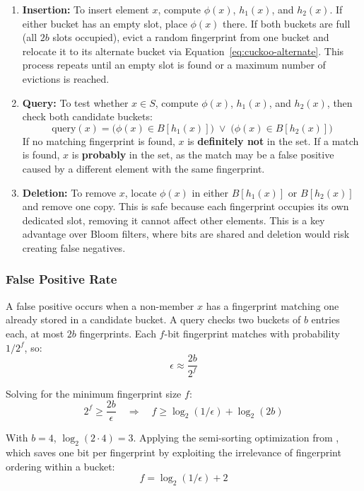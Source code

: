 \begin{enumerate}
  \item \textbf{Insertion:} To insert element $x$, compute $\phi(x)$, $h_1(x)$, 
and $h_2(x)$. If either bucket has an empty slot, place $\phi(x)$ there. 
If both buckets are full (all $2b$ slots occupied), evict a random 
fingerprint from one bucket and relocate it to its alternate bucket via 
Equation~\ref{eq:cuckoo-alternate}. This process repeats until an empty 
slot is found or a maximum number of evictions is reached.
\item \textbf{Query:} To test whether $x \in S$, compute $\phi(x)$, $h_1(x)$, 
and $h_2(x)$, then check both candidate buckets:
\[
  \text{query}(x) = \big(\phi(x) \in B[h_1(x)]\big) \;\lor\; 
                     \big(\phi(x) \in B[h_2(x)]\big)
\]
If no matching fingerprint is found, $x$ is \textbf{definitely not} in 
the set. If a match is found, $x$ is \textbf{probably} in the set, as the match may be a false positive caused by a different element with the 
same fingerprint.
\item \textbf{Deletion:} To remove $x$, locate $\phi(x)$ in either 
$B[h_1(x)]$ or $B[h_2(x)]$ and remove one copy. This is safe because 
each fingerprint occupies its own dedicated slot, removing it cannot 
affect other elements. This is a key advantage over Bloom filters, where 
bits are shared and deletion would risk creating false negatives.
\end{enumerate}

\subsubsection{False Positive Rate}

A false positive occurs when a non-member $x$ has a fingerprint matching 
one already stored in a candidate bucket. A query checks two buckets of 
$b$ entries each, at most $2b$ fingerprints. Each $f$-bit fingerprint 
matches with probability $1/2^f$, so:
\begin{equation}
  \epsilon \approx \frac{2b}{2^f}
  \label{eq:cuckoo-fpr}
\end{equation}

Solving for the minimum fingerprint size $f$:
\[
  2^f \geq \frac{2b}{\epsilon} \quad \Longrightarrow \quad 
  f \geq \log_2(1/\epsilon) + \log_2(2b)
\]

With $b = 4$, $\log_2(2 \cdot 4) = 3$. Applying the semi-sorting 
optimization from \cite{cuckoo}, which saves one bit per fingerprint by 
exploiting the irrelevance of fingerprint ordering within a bucket:
\begin{equation}
  f = \log_2(1/\epsilon) + 2
  \label{eq:cuckoo-fp-size}
\end{equation}

